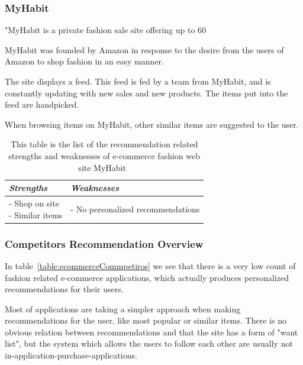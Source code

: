 \subsubsection{MyHabit} %
\label{par:myhabit}
    "MyHabit is a private fashion sale site offering up to 60%

    MyHabit was founded by Amazon in response to the desire from the users of Amazon to shop fashion in an easy manner.

    The site displays a feed.
    This feed is fed by a team from MyHabit, and is constantly updating with new sales and new products.
    The items put into the feed are handpicked.

    When browsing items on MyHabit, other similar items are suggested to the user.
    \begin{table}[H]
        \centering
        \begin{tabular}{l|l}
            \toprule
            \emph{Strengths} & \emph{Weaknesses} \\ \hline
            \pbox{9cm}{
                - Shop on site \\
                - Similar items
            } & \pbox{9cm}{
                - No personalized recommendations \\
            } \\ \bottomrule
        \end{tabular}
        \caption[Recommendation related strengths and weaknesses of MyHabit~\cite{MyHabit}]{This table is the list of the recommendation related strengths and weaknesses of e-commerce fashion web site MyHabit~\cite{MyHabit}}
        \label{table:ecommenreceMyHabit}
    \end{table}

\subsubsection{Competitors Recommendation Overview} %
\label{par:competitors_recommendation_overview}
    In table~\ref{table:ecommerceCommpetiros} we see that there is a very low count of fashion related e-commerce applications, which actually produces personalized recommendations for their users.

    Most of applications are taking a simpler approach when making recommendations for the user, like most popular or similar items.
    There is no obvious relation between recommendations and that the site has a form of "want list", but the system which allows the users to follow each other are usually not in-application-purchase-applications.

